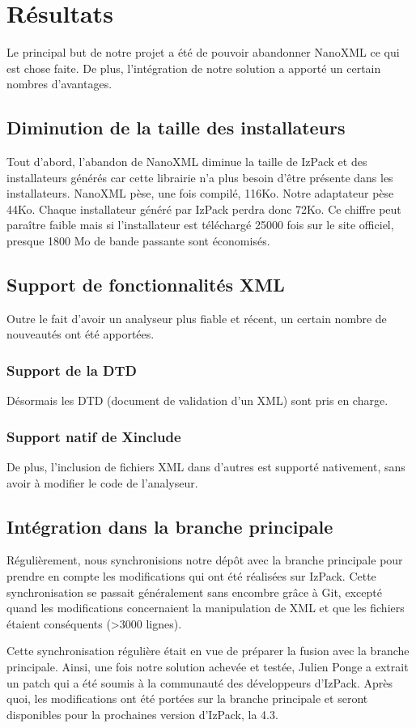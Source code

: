\section{Résultats}
Le principal but de notre projet a été de pouvoir abandonner NanoXML ce qui est chose faite.
De plus, l'intégration de notre solution a apporté un certain nombres d'avantages.
\subsection{Diminution de la taille des installateurs}
Tout d'abord, l'abandon de NanoXML diminue la taille de IzPack et des installateurs générés car cette librairie n'a plus besoin d'être présente dans les installateurs.
NanoXML pèse, une fois compilé, 116Ko.
Notre adaptateur pèse 44Ko.
Chaque installateur généré par IzPack perdra donc 72Ko.
Ce chiffre peut paraître faible mais si l'installateur est téléchargé 25000 fois sur le site officiel, presque 1800 Mo de bande passante sont économisés.
\subsection{Support de fonctionnalités XML}
Outre le fait d'avoir un analyseur plus fiable et récent, un certain nombre de nouveautés ont été apportées.
\subsubsection{Support de la DTD}
Désormais les DTD (document de validation d'un XML) sont pris en charge.
\subsubsection{Support natif de Xinclude}
De plus, l'inclusion de fichiers XML dans d'autres est supporté nativement, sans avoir à modifier le code de l'analyseur.
\subsection{Intégration dans la branche principale}
Régulièrement, nous synchronisions notre dépôt avec la branche principale pour prendre en compte les modifications qui ont été réalisées sur IzPack.
Cette synchronisation se passait généralement sans encombre grâce à Git, excepté quand les modifications concernaient la manipulation de XML et que les fichiers étaient conséquents (>3000 lignes).

Cette synchronisation régulière était en vue de préparer la fusion avec la branche principale.
Ainsi, une fois notre solution achevée et testée, Julien Ponge a extrait un patch qui a été soumis à la communauté des développeurs d'IzPack.
Après quoi, les modifications ont été portées sur la branche principale et seront disponibles pour la prochaines version d'IzPack, la 4.3.

